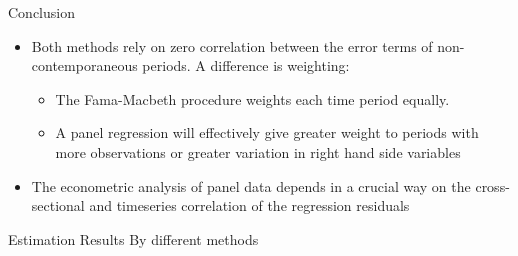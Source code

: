 \documentclass{beamer}
\begin{document}
\begin{frame}{Conclusion}
\begin{itemize}
\item Both methods rely on zero correlation between the error terms of non-contemporaneous periods. A difference is weighting: 
\begin{itemize}
\item The Fama-Macbeth procedure weights each time period equally.
\item A panel regression will effectively give greater weight to periods with more observations or greater variation in right hand side variables
\end{itemize}
\item The econometric analysis of panel data depends in a crucial way on the cross-sectional and timeseries correlation of the regression residuals
\end{itemize}
\end{frame}
\begin{frame}{Estimation Results }{By different methods}
\begin{table}[htbp]
\centering
    \resizebox{\textheight}{!}{

}
\end{table}
\end{frame}
\end{document}
